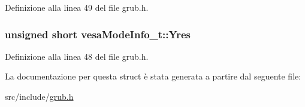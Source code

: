 Definizione alla linea 49 del file grub.\+h.

\hypertarget{structvesaModeInfo__t_a54003f0083b0581fc14babfec48a1d7d}{
\subsubsection[{Yres}]{\setlength{\rightskip}{0pt plus 5cm}unsigned short vesa\+Mode\+Info\+\_\+t\+::\+Yres}}\label{structvesaModeInfo__t_a54003f0083b0581fc14babfec48a1d7d}


Definizione alla linea 48 del file grub.\+h.



La documentazione per questa struct è stata generata a partire dal seguente file\+:\begin{DoxyCompactItemize}
\item 
src/include/\hyperlink{grub_8h}{grub.\+h}\end{DoxyCompactItemize}

